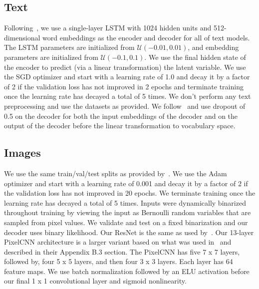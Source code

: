 \documentclass{article} \usepackage{iclr2019_conference,times}
\def\gU{{\mathcal{U}}}
\begin{document}
\subsection{Text}\label{apdix:text}
Following~\citet{kim2018semi}, we use a single-layer LSTM with 1024 hidden units and 512-dimensional word embeddings as the encoder and decoder for all of text models. The LSTM parameters are initialized from $\gU(-0.01, 0.01)$, and embedding parameters are initialized from $\gU(-0.1, 0.1)$. We use the final hidden state of the encoder to predict (via a linear transformation) the latent variable. We use the SGD optimizer and start with a learning rate of 1.0 and decay it by a factor of 2 if the validation loss has not improved in 2 epochs and terminate training once the learning rate has decayed a total of 5 times. We don't perform any text preprocessing and use the datasets as provided. We follow~\citet{kim2018semi} and use dropout of 0.5 on the decoder for both the input embeddings of the decoder and on the output of the decoder before the linear transformation to vocabulary space.

\subsection{Images}\label{apdix:image}
We use the same train/val/test splits as provided by~\cite{kim2018semi}. We use the Adam optimizer and start with a learning rate of 0.001 and decay it by a factor of 2 if the validation loss has not improved in 20 epochs. We terminate training once the learning rate has decayed a total of 5 times. Inputs were dynamically binarized throughout training by viewing the input as Bernoulli random variables that are sampled from pixel values. We validate and test on a fixed binarization and our decoder uses binary likelihood. Our ResNet is the same as used by~\cite{chen2016variational}. Our 13-layer PixelCNN architecture is a larger variant based on what was used in~\cite{kim2018semi} and described in their Appendix B.3 section. The PixelCNN has five 7 x 7 layers, followed by, four 5 x 5 layers, and then four 3 x 3 layers. Each layer has 64 feature maps. We use batch normalization followed by an ELU activation before our final 1 x 1 convolutional layer and sigmoid nonlinearity.
\end{document}
